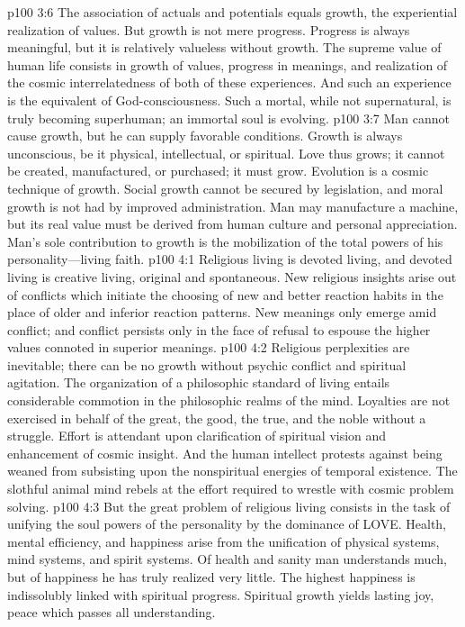 \vs p100 3:6 The association of actuals and potentials equals growth, the experiential realization of values. But growth is not mere progress. Progress is always meaningful, but it is relatively valueless without growth. The supreme value of human life consists in growth of values, progress in meanings, and realization of the cosmic interrelatedness of both of these experiences. And such an experience is the equivalent of God\hyp{}consciousness. Such a mortal, while not supernatural, is truly becoming superhuman; an immortal soul is evolving.
\vs p100 3:7 Man cannot cause growth, but he can supply favorable conditions. Growth is always unconscious, be it physical, intellectual, or spiritual. Love thus grows; it cannot be created, manufactured, or purchased; it must grow. Evolution is a cosmic technique of growth. Social growth cannot be secured by legislation, and moral growth is not had by improved administration. Man may manufacture a machine, but its real value must be derived from human culture and personal appreciation. Man’s sole contribution to growth is the mobilization of the total powers of his personality---living faith.
\vs p100 4:1 Religious living is devoted living, and devoted living is creative living, original and spontaneous. New religious insights arise out of conflicts which initiate the choosing of new and better reaction habits in the place of older and inferior reaction patterns. New meanings only emerge amid conflict; and conflict persists only in the face of refusal to espouse the higher values connoted in superior meanings.
\vs p100 4:2 Religious perplexities are inevitable; there can be no growth without psychic conflict and spiritual agitation. The organization of a philosophic standard of living entails considerable commotion in the philosophic realms of the mind. Loyalties are not exercised in behalf of the great, the good, the true, and the noble without a struggle. Effort is attendant upon clarification of spiritual vision and enhancement of cosmic insight. And the human intellect protests against being weaned from subsisting upon the nonspiritual energies of temporal existence. The slothful animal mind rebels at the effort required to wrestle with cosmic problem solving.
\vs p100 4:3 But the great problem of religious living consists in the task of unifying the soul powers of the personality by the dominance of LOVE. Health, mental efficiency, and happiness arise from the unification of physical systems, mind systems, and spirit systems. Of health and sanity man understands much, but of happiness he has truly realized very little. The highest happiness is indissolubly linked with spiritual progress. Spiritual growth yields lasting joy, peace which passes all understanding.
